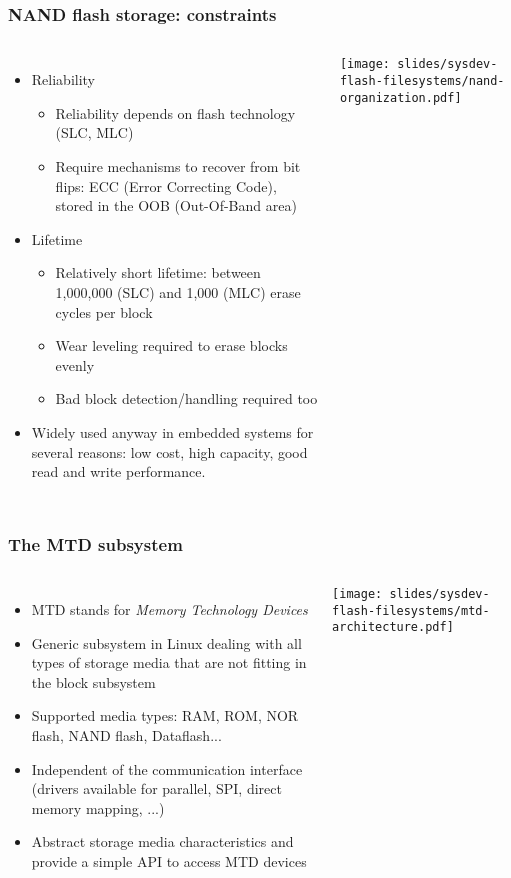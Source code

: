 \begin{frame}[fragile]
  \frametitle{NAND flash storage: constraints}
  \begin{columns}
  \small
  \small
  \begin{itemize}
  \item Reliability
    \begin{itemize}
    \item Reliability depends on flash technology (SLC, MLC)
    \item Require mechanisms to recover from bit flips: ECC (Error
          Correcting Code), stored in the OOB (Out-Of-Band area)
    \end{itemize}
  \item Lifetime
    \begin{itemize}
    \item Relatively short lifetime: between 1,000,000 (SLC) and 1,000
          (MLC) erase cycles per block
    \item Wear leveling required to erase blocks evenly
    \item Bad block detection/handling required too
    \end{itemize}
  \item Widely used anyway in embedded systems for several reasons:
        low cost, high capacity, good read and write performance.
  \end{itemize}
  \texttt{[image: slides/sysdev-flash-filesystems/nand-organization.pdf]}
  \end{columns}
\end{frame}

\begin{frame}
  \frametitle{The MTD subsystem}
  \begin{columns}
  \begin{itemize}
  \item MTD stands for {\em Memory Technology Devices}
  \item Generic subsystem in Linux dealing with all types of storage media that
        are not fitting in the block subsystem
  \item Supported media types: RAM, ROM, NOR flash, NAND flash,
        Dataflash...
  \item Independent of the communication interface (drivers available
        for parallel, SPI, direct memory mapping, ...)
  \item Abstract storage media characteristics and provide a simple
        API to access MTD devices
  \end{itemize}
    \texttt{[image: slides/sysdev-flash-filesystems/mtd-architecture.pdf]}
  \end{columns}
\end{frame}

